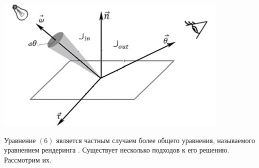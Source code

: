 \begin{center}
\includegraphics[width=0.499\linewidth]{rendering-equation.png}
\end{center}

Уравнение $(6)$ является частным случаем более общего уравнения, называемого уравнением рендеринга  \cite{rendering-equ}. Существует несколько подходов к его решению. Рассмотрим их.
